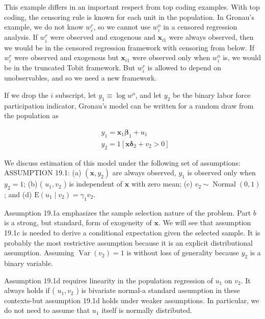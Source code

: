\documentclass[10pt]{article}
\begin{document}
This example differs in an important respect from top coding examples. With top coding, the censoring rule is known for each unit in the population. In Gronau's example, we do not know $w_{i}^{r}$, so we cannot use $w_{i}^{\mathrm{o}}$ in a censored regression analysis. If $w_{i}^{r}$ were observed and exogenous and $\mathbf{x}_{i 1}$ were always observed, then we would be in the censored regression framework with censoring from below. If $w_{i}^{r}$ were observed and exogenous but $\mathbf{x}_{i 1}$ were observed only when $w_{i}^{\mathrm{o}}$ is, we would be in the truncated Tobit framework. But $w_{i}^{r}$ is allowed to depend on unobservables, and so we need a new framework.

If we drop the $i$ subscript, let $y_{1} \equiv \log w^{\mathrm{o}}$, and let $y_{2}$ be the binary labor force participation indicator, Gronau's model can be written for a random draw from the population as


\begin{align*}
& y_{1}=\mathbf{x}_{1} \boldsymbol{\beta}_{1}+u_{1}  \tag{19.50}\\
& y_{2}=1\left[\mathbf{x} \boldsymbol{\delta}_{2}+v_{2}>0\right] \tag{19.51}
\end{align*}


We discuss estimation of this model under the following set of assumptions:\\
ASSUMPTION 19.1: (a) $\left(\mathbf{x}, y_{2}\right)$ are always observed, $y_{1}$ is observed only when $y_{2}=1$; (b) ( $u_{1}, v_{2}$ ) is independent of $\mathbf{x}$ with zero mean; (c) $v_{2} \sim \operatorname{Normal}(0,1)$; and (d) $\mathrm{E}\left(u_{1} \mid v_{2}\right)=\gamma_{1} v_{2}$.

Assumption 19.1a emphasizes the sample selection nature of the problem. Part $b$ is a strong, but standard, form of exogeneity of $\mathbf{x}$. We will see that assumption 19.1c is needed to derive a conditional expectation given the selected sample. It is probably the most restrictive assumption because it is an explicit distributional assumption. Assuming $\operatorname{Var}\left(v_{2}\right)=1$ is without loss of generality because $y_{2}$ is a binary variable.

Assumption 19.1d requires linearity in the population regression of $u_{1}$ on $v_{2}$. It always holds if ( $u_{1}, v_{2}$ ) is bivariate normal-a standard assumption in these contexts-but assumption 19.1d holds under weaker assumptions. In particular, we do not need to assume that $u_{1}$ itself is normally distributed.
\end{document}
